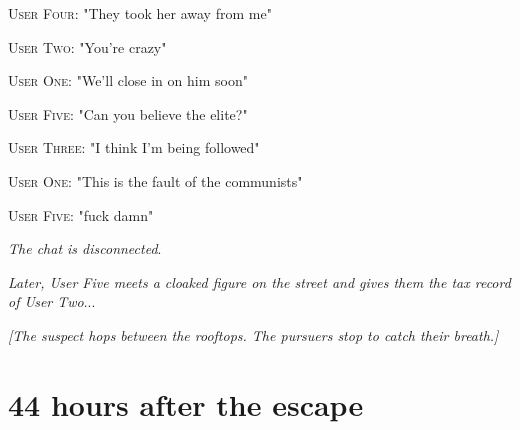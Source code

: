 \documentclass{report}
\begin{document}
\textsc{User Four}: "They took her away from me" 

\textsc{User Two}: "You're crazy" 

\textsc{User One}: "We'll close in on him soon" 

\textsc{User Five}: "Can you believe the elite?" 

\textsc{User Three}: "I think I'm being followed" 

\textsc{User One}: "This is the fault of the communists" 

\textsc{User Five}: "fuck damn" 

\textit{The chat is disconnected}. 

\textit{Later, User Five meets a cloaked figure on the street and gives them the tax record of User Two}...

\textit{[The suspect hops between the rooftops. The pursuers stop to catch their breath.]}


\section*{44 \small{hours after the escape}}
\end{document}
